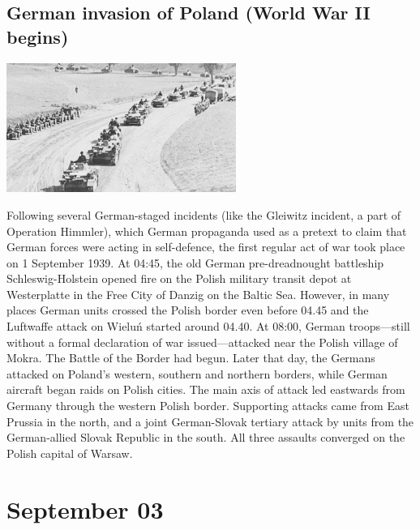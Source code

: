 \documentclass[11pt]{report}
\begin{document}
\subsection{German invasion of Poland (World War II begins)}
\vspace{2mm}\begin{center}\includegraphics[width=7.5cm]{./img/gerInvadesPol.jpg}\end{center}
Following several German-staged incidents (like the Gleiwitz incident, a part of Operation Himmler), which German propaganda used as a pretext to claim that German forces were acting in self-defence, the first regular act of war took place on 1 September 1939. At 04:45, the old German pre-dreadnought battleship Schleswig-Holstein opened fire on the Polish military transit depot at Westerplatte in the Free City of Danzig on the Baltic Sea. However, in many places German units crossed the Polish border even before 04.45 and the Luftwaffe attack on Wieluń started around 04.40. At 08:00, German troops—still without a formal declaration of war issued—attacked near the Polish village of Mokra. The Battle of the Border had begun. Later that day, the Germans attacked on Poland's western, southern and northern borders, while German aircraft began raids on Polish cities. The main axis of attack led eastwards from Germany through the western Polish border. Supporting attacks came from East Prussia in the north, and a joint German-Slovak tertiary attack by units from the German-allied Slovak Republic in the south. All three assaults converged on the Polish capital of Warsaw.
\section{September 03}
\end{document}
